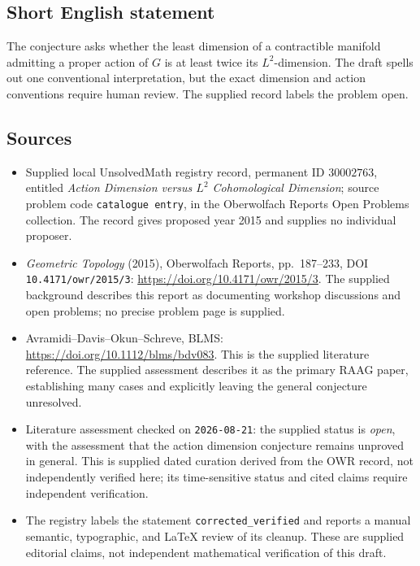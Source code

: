 \documentclass[11pt]{article}
\begin{document}
\subsection{Short English statement}
The conjecture asks whether the least dimension of a contractible manifold admitting a proper action of \(G\) is at least twice its \(L^2\)-dimension. The draft spells out one conventional interpretation, but the exact dimension and action conventions require human review. The supplied record labels the problem open.
\subsection{Sources}
\begin{itemize}
\item Supplied local UnsolvedMath registry record, permanent ID \(30002763\), entitled \emph{Action Dimension versus \(L^2\) Cohomological Dimension}; source problem code \texttt{catalogue entry}, in the Oberwolfach Reports Open Problems collection. The record gives proposed year 2015 and supplies no individual proposer.
\item \emph{Geometric Topology} (2015), Oberwolfach Reports, pp.\ 187--233, DOI \texttt{10.4171/owr/2015/3}: \url{https://doi.org/10.4171/owr/2015/3}. The supplied background describes this report as documenting workshop discussions and open problems; no precise problem page is supplied.
\item Avramidi--Davis--Okun--Schreve, BLMS: \url{https://doi.org/10.1112/blms/bdv083}. This is the supplied literature reference. The supplied assessment describes it as the primary RAAG paper, establishing many cases and explicitly leaving the general conjecture unresolved.
\item Literature assessment checked on \texttt{2026-08-21}: the supplied status is \emph{open}, with the assessment that the action dimension conjecture remains unproved in general. This is supplied dated curation derived from the OWR record, not independently verified here; its time-sensitive status and cited claims require independent verification.
\item The registry labels the statement \texttt{corrected\_verified} and reports a manual semantic, typographic, and LaTeX review of its cleanup. These are supplied editorial claims, not independent mathematical verification of this draft.
\end{itemize}
\end{document}
